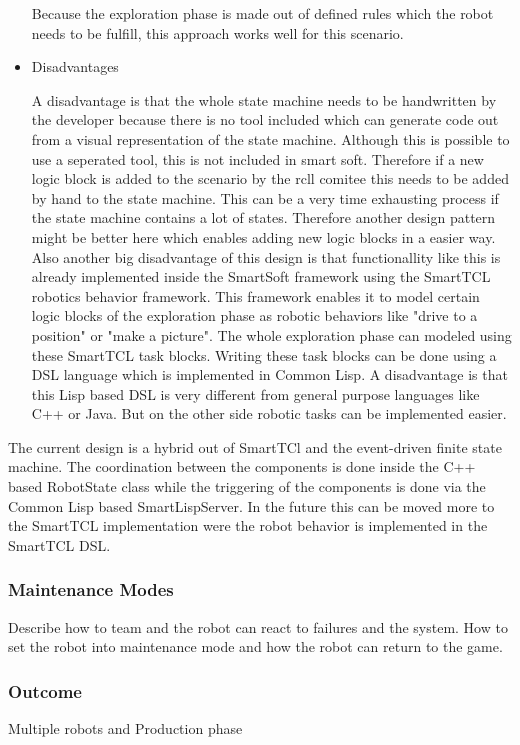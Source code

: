 \begin{itemize}
Because the exploration phase is made out of defined rules which the robot needs to be fulfill, this approach works well for this scenario. 


\item Disadvantages

A disadvantage is that the whole state machine needs to be handwritten by the developer because there is no tool included which can generate code out from a visual representation 
of the state machine. Although this is possible to use a seperated tool, this is not included in smart soft. Therefore if a new logic block is added to the scenario by the rcll comitee this needs to be added by hand to the state machine. This can be a very time exhausting process if the state machine contains a lot of states. Therefore another design pattern might be better here which enables adding new logic blocks in a easier way. \\

Also another big disadvantage of this design is that functionallity like this is already implemented inside the SmartSoft framework using the SmartTCL robotics behavior framework.
This framework enables it to model certain logic blocks of the exploration phase as robotic behaviors like "drive to a position" or "make a picture". The whole exploration phase can modeled using these SmartTCL task blocks. Writing these task blocks can be done using a DSL language which is implemented in Common Lisp. A disadvantage is that this Lisp based DSL is 
very different from general purpose languages like C++ or Java. But on the other side robotic tasks can be implemented easier. 


\end{itemize}


The current design is a hybrid out of SmartTCl and the event-driven finite state machine. The coordination between the components is done inside the C++ based RobotState class while the
triggering of the components is done via the Common Lisp based SmartLispServer. In the future this can be moved more to the SmartTCL implementation were the robot behavior is implemented in the SmartTCL DSL. 


\subsubsection{Maintenance Modes}

Describe how to team and the robot can react to failures and the system. How to set the robot into maintenance mode and how the robot can return to the game. 


\subsubsection{Outcome}

Multiple robots and Production phase







